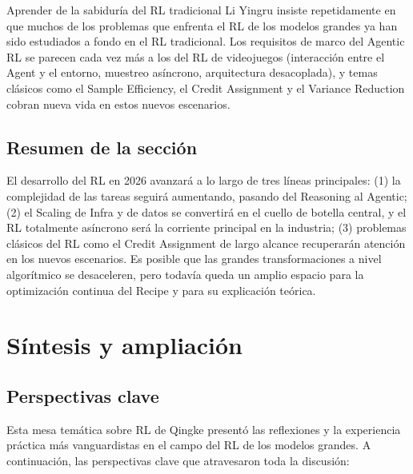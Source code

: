 \documentclass[a4paper]{article}
\begin{document}
\begin{knowledgebox}{Aprender de la sabiduría del RL tradicional}
Li Yingru insiste repetidamente en que muchos de los problemas que enfrenta el RL de los modelos grandes ya han sido estudiados a fondo en el RL tradicional. Los requisitos de marco del Agentic RL se parecen cada vez más a los del RL de videojuegos (interacción entre el Agent y el entorno, muestreo asíncrono, arquitectura desacoplada), y temas clásicos como el Sample Efficiency, el Credit Assignment y el Variance Reduction cobran nueva vida en estos nuevos escenarios.
\end{knowledgebox}

\subsection{Resumen de la sección}

El desarrollo del RL en 2026 avanzará a lo largo de tres líneas principales: (1) la complejidad de las tareas seguirá aumentando, pasando del Reasoning al Agentic; (2) el Scaling de Infra y de datos se convertirá en el cuello de botella central, y el RL totalmente asíncrono será la corriente principal en la industria; (3) problemas clásicos del RL como el Credit Assignment de largo alcance recuperarán atención en los nuevos escenarios. Es posible que las grandes transformaciones a nivel algorítmico se desaceleren, pero todavía queda un amplio espacio para la optimización continua del Recipe y para su explicación teórica.

\section{Síntesis y ampliación}

\subsection{Perspectivas clave}

Esta mesa temática sobre RL de Qingke presentó las reflexiones y la experiencia práctica más vanguardistas en el campo del RL de los modelos grandes. A continuación, las perspectivas clave que atravesaron toda la discusión:
\end{document}
